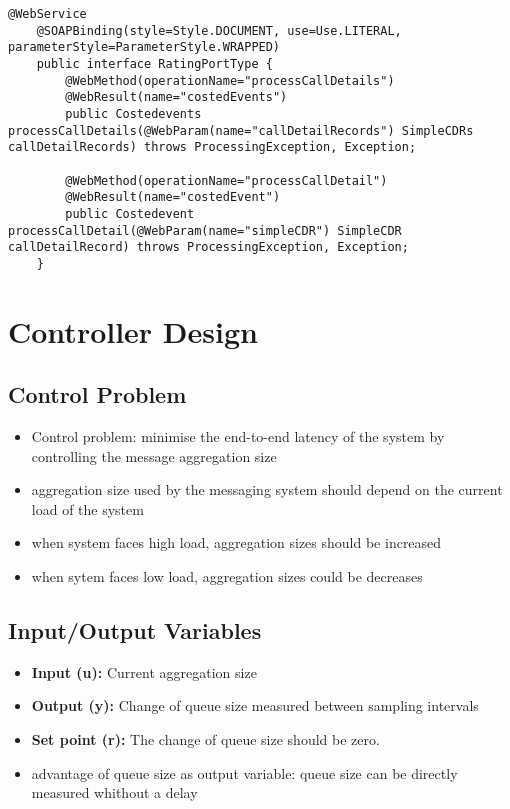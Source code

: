 \begin{lstlisting}[caption={Java interface of a web  service offering different operations for single and batch processing.},label=listing:ch5_service_design_if]
	@WebService
	@SOAPBinding(style=Style.DOCUMENT, use=Use.LITERAL, parameterStyle=ParameterStyle.WRAPPED)
	public interface RatingPortType {
		@WebMethod(operationName="processCallDetails")
		@WebResult(name="costedEvents")
		public Costedevents processCallDetails(@WebParam(name="callDetailRecords") SimpleCDRs callDetailRecords) throws ProcessingException, Exception;
	
		@WebMethod(operationName="processCallDetail")
		@WebResult(name="costedEvent")
		public Costedevent processCallDetail(@WebParam(name="simpleCDR") SimpleCDR callDetailRecord) throws ProcessingException, Exception;
	}
\end{lstlisting}

\section{Controller Design}
\label{sec:ch05_controller_design}
\subsection{Control Problem}

\begin{itemize}
	\item Control problem: minimise the end-to-end latency of the system by controlling the message aggregation size
	\item aggregation size used by the messaging system should depend on the current load of the system
	\item when system faces high load, aggregation sizes should be increased
	\item when sytem faces low load, aggregation sizes could be decreases
\end{itemize}
\subsection{Input/Output Variables}

\begin{itemize}
	\item \textbf{Input (u):} Current aggregation size
	\item \textbf{Output (y):} Change of queue size measured between sampling intervals
	\item \textbf{Set point (r):} The change of queue size should be zero.
	\item advantage of queue size as output variable: queue size can be directly measured whithout a delay
\end{itemize}

